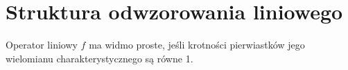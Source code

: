 \section{Struktura odwzorowania liniowego}


\begin{definition}
    Operator liniowy $f$ ma widmo proste, jeśli krotności pierwiastków jego wielomianu charakterystycznego są równe 1.
\end{definition}